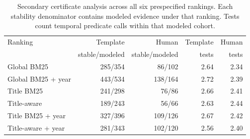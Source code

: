 \begin{table}[t]
\centering\small
\begin{tabular}{lrrrr}
\toprule
Ranking & Template & Human & Template & Human \\
 & stable/modeled & stable/modeled & tests & tests \\
\midrule
Global BM25 & 285/354 & 86/102 & 2.64 & 2.34 \\
Global BM25 + year & 443/534 & 138/164 & 2.72 & 2.39 \\
Title BM25 & 241/298 & 76/86 & 2.66 & 2.41 \\
Title-aware & 189/243 & 56/66 & 2.63 & 2.44 \\
Title BM25 + year & 327/396 & 109/126 & 2.67 & 2.42 \\
Title-aware + year & 281/343 & 102/120 & 2.56 & 2.40 \\
\bottomrule
\end{tabular}
\caption{Secondary certificate analysis across all six prespecified rankings. Each stability denominator contains modeled evidence under that ranking. Tests count temporal predicate calls within that modeled cohort.}
\label{tab:ranking-portability}
\end{table}
